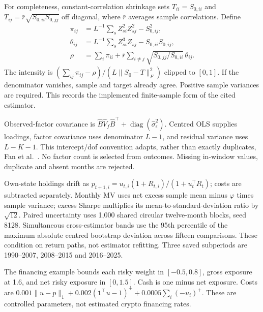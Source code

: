 \documentclass[sigconf,anonymous,review]{acmart}
\begin{document}
For completeness, constant-correlation shrinkage sets $T_{ii}=S_{0,ii}$ and $T_{ij}=\bar r\sqrt{S_{0,ii}S_{0,jj}}$ off diagonal, where $\bar r$ averages sample correlations. Define
\begin{align*}
\pi_{ij}&=L^{-1}\sum_s Z_{si}^2Z_{sj}^2-S_{0,ij}^2,\\
\theta_{ij}&=L^{-1}\sum_s Z_{si}^3Z_{sj}-S_{0,ii}S_{0,ij},\\
\rho&=\sum_i\pi_{ii}+\bar r\sum_{i\ne j}
\sqrt{S_{0,jj}/S_{0,ii}}\,\theta_{ij}.
\end{align*}
The intensity is $(\sum_{ij}\pi_{ij}-\rho)/(L\|S_0-T\|_F^2)$ clipped to $[0,1]$. If the denominator vanishes, sample and target already agree. Positive sample variances are required. This records the implemented finite-sample form of the cited estimator.


Observed-factor covariance is $\widehat B\widehat V_f\widehat B^\top+\operatorname{diag}(\widehat\sigma_\epsilon^2)$. Centred OLS supplies loadings, factor covariance uses denominator $L-1$, and residual variance uses $L-K-1$. This intercept/dof convention adapts, rather than exactly duplicates, Fan et al.~\cite{fan2008}. No factor count is selected from outcomes. Missing in-window values, duplicate and absent months are rejected.

Own-state holdings drift as $p_{t+1,i}=u_{t,i}(1+R_{t,i})/(1+u_t^\top R_t)$; costs are subtracted separately. Monthly MV uses net excess sample mean minus $\varphi$ times sample variance; excess Sharpe multiplies its mean-to-standard-deviation ratio by $\sqrt{12}$. Paired uncertainty uses 1,000 shared circular twelve-month blocks, seed 8128. Simultaneous cross-estimator bands use the 95th percentile of the maximum absolute centred bootstrap deviation across fifteen comparisons. These condition on return paths, not estimator refitting. Three saved subperiods are 1990--2007, 2008--2015 and 2016--2025.

The financing example bounds each risky weight in $[-0.5,0.8]$, gross exposure at 1.6, and net risky exposure in $[0,1.5]$. Cash is one minus net exposure. Costs are $0.001\|u-p\|_1+0.002(\mathbf1^\top u-1)^++0.0005\sum_i(-u_i)^+$. These are controlled parameters, not estimated crypto financing rates.
\end{document}
